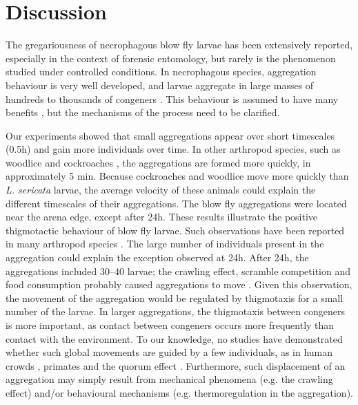 \clearpage


\section{Discussion}
The gregariousness of necrophagous blow fly larvae has been extensively reported, especially in the context of forensic entomology, but rarely is the phenomenon studied under controlled conditions. In necrophagous species, aggregation behaviour is very well developed, and larvae aggregate in large masses of hundreds to thousands of congeners \citep{ives_aggregation_1991,slone_thermoregulation_2007}. This behaviour is assumed to have many benefits \citep{baxter_dynamics_1983, stephens_consequences_1999, slone_thermoregulation_2007, charabidze_larval-mass_2011, rivers_physiological_2011}, but the mechanisms of the process need to be clarified.

Our experiments showed that small aggregations appear over short timescales (0.5h) and gain more individuals over time. In other arthropod species, such as woodlice \citep{devigne_individual_2011,broly_aggregation_2012} and cockroaches \citep{jeanson_self-organized_2005}, the aggregations are formed more quickly, in approximately 5 min. Because cockroaches and woodlice move more quickly than \textit{L. sericata} larvae, the average velocity of these animals could explain the different timescales of their aggregations. The blow fly aggregations were located near the arena edge, except after 24h. These results illustrate the positive thigmotactic behaviour of blow fly larvae. Such observations have been reported in many arthropod species \citep{devigne_individual_2011, mailleux_collective_2011}. The large number of individuals present in the aggregation could explain the exception observed at 24h. After 24h, the aggregations included 30–40 larvae; the crawling effect, scramble competition and food consumption probably caused aggregations to move \citep{berrigan_how_1995}. Given this observation, the movement of the aggregation would be regulated by thigmotaxis for a small number of the larvae. In larger aggregations, the thigmotaxis between congeners is more important, as contact between congeners occurs more frequently than contact with the environment. To our knowledge, no studies have demonstrated whether such global movements are guided by a few individuals, as in human crowds \citep{dyer_consensus_2008}, primates \citep{sueur_selective_2009}  and the quorum effect \citep{sempo_complex_2009}. Furthermore, such displacement of an aggregation may simply result from mechanical phenomena (e.g. the crawling effect) and/or behavioural mechanisms (e.g. thermoregulation in the aggregation).

